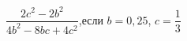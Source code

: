 \begin{ex}[type=simplify_calculate]
	\begin{condition}
		\( \dfrac{2c^2-2b^2}{4b^2-8bc+4c^2} \),\quad если \( b=0,25 \), \( c=\dfrac{1}{3} \)
	\end{condition}
\end{ex}